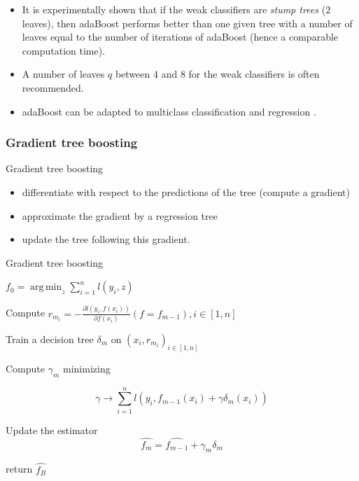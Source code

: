 \documentclass[usenames,dvipsnames]{beamer}
\DeclareMathOperator*{\argmin}{arg\,min}
\newcommand\Fontvi{\fontsize{8}{8}\selectfont}
\begin{document}
\begin{frame}
    \begin{itemize}
        \item It is experimentally shown that if the weak classifiers are \textit{{stump trees}} ($2$ leaves), then adaBoost performs better than one given tree with a number of leaves equal to the number of iterations of adaBoost (hence a comparable computation time).
	\item A number of leaves $q$ between $4$ and $8$ for the weak classifiers is often recommended.
	\item adaBoost can be adapted to multiclass classification and regression \cite{Schapire2003}. 
    \end{itemize}
\end{frame}


\subsubsection{Gradient tree boosting}%
\label{ssub:e}

\begin{frame}{Gradient tree boosting}
    \begin{itemize}
	\item differentiate with respect to the predictions of the tree (compute a gradient)
	\item approximate the gradient by a regression tree
	\item update the tree following this gradient.
    \end{itemize}
\end{frame}

\begin{frame}{Gradient tree boosting}
\begin{algorithm}[H]
\Fontvi
	 $f_0 = \argmin_{z} \sum^{n}_{i=1} l(y_i, z)$\;
 	{
	    Compute $r_{m_i} = - \frac{\partial l (y_i, f(x_i))}{\partial f(x_i)}(f=f_{m-1})  , i\in [1, n]$

	    Train a decision tree $ \delta_m$ on $(x_i, r_{m_i})_{i\in [1, n]}$

	    Compute $ \gamma_m$ minimizing

	    \begin{equation}
		\gamma \rightarrow \sum^{n}_{i=1} l(y_i, f_{m-1}(x_i) + \gamma \delta_m(x_i))
	    \end{equation}

	    Update the estimator
	    \begin{equation}
		\hat{f_m} = \hat{f_{m-1}}+ \gamma_m \delta_m
	    \end{equation}
  	}
	return $ \hat{f_B}$
	\caption{Gradient tree boosting}
\end{algorithm}
\end{frame}
\end{document}

